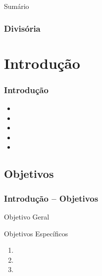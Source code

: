 \documentclass[aspectratio=169]{beamer}
\begin{document}
\begin{frame}
  \titlepage
\end{frame}


\begin{frame}[fragile]{Sumário}
  \tableofcontents
\end{frame}


\begin{frame} \frametitle{Divisória}
\begin{center}
  \lipsum[1][1]
\end{center}
\end{frame}


\section{Introdução}

\begin{frame}[fragile] \frametitle{Introdução}
\begin{itemize} \itemsep1em
    \item \lipsum[1][2]
    \item \lipsum[1][3]
    \item \lipsum[1][4]
    \item \lipsum[1][5]
    \item \lipsum[1][6]
  \end{itemize}
\end{frame}


\subsection{Objetivos}

\begin{frame}[fragile] \frametitle{Introdução -- Objetivos}
\begin{block}{Objetivo Geral}
  \lipsum[1][7-9]
\end{block}
\vspace{1em}
\begin{block}{Objetivos Específicos}
  \begin{enumerate}
    \item \lipsum[1][10]
    \item \lipsum[1][11]
    \item \lipsum[1][12]
  \end{enumerate}
\end{block}
\end{frame}
\end{document}
